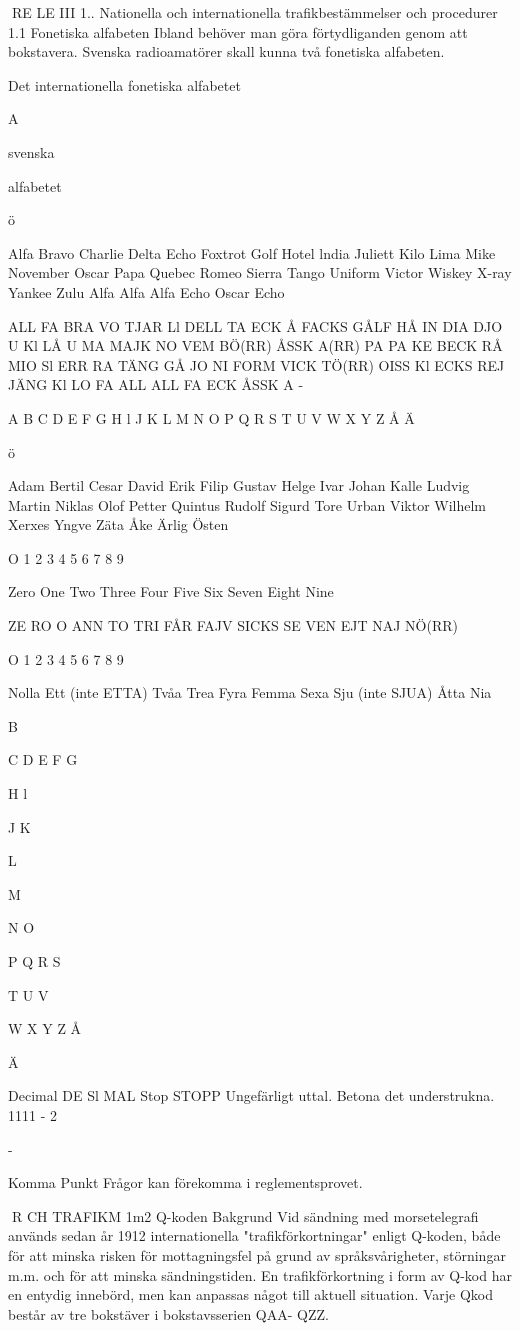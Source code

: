 RE LE
III 1.. Nationella och internationella trafikbestämmelser
och procedurer
1.1 Fonetiska alfabeten
Ibland behöver man göra förtydliganden genom att bokstavera.
Svenska radioamatörer skall kunna två fonetiska alfabeten.

Det internationella fonetiska alfabetet

A

svenska

alfabetet

ö

Alfa
Bravo
Charlie
Delta
Echo
Foxtrot
Golf
Hotel
lndia
Juliett
Kilo
Lima
Mike
November
Oscar
Papa
Quebec
Romeo
Sierra
Tango
Uniform
Victor
Wiskey
X-ray
Yankee
Zulu
Alfa Alfa
Alfa Echo
Oscar Echo

ALL FA
BRA VO
TJAR Ll
DELL TA
ECK Å
FACKS
GÅLF
HÅ
IN DIA
DJO U
Kl LÅ
U MA
MAJK
NO VEM BÖ(RR)
ÅSSK A(RR)
PA PA
KE BECK
RÅ MIO
Sl ERR RA
TÄNG GÅ
JO NI FORM
VICK TÖ(RR)
OISS Kl
ECKS REJ
JÄNG Kl
LO
FA ALL
ALL FA ECK
ÅSSK A -

A
B
C
D
E
F
G
H
l
J
K
L
M
N
O
P
Q
R
S
T
U
V
W
X
Y
Z
Å
Ä

ö

Adam
Bertil
Cesar
David
Erik
Filip
Gustav
Helge
Ivar
Johan
Kalle
Ludvig
Martin
Niklas
Olof
Petter
Quintus
Rudolf
Sigurd
Tore
Urban
Viktor
Wilhelm
Xerxes
Yngve
Zäta
Åke
Ärlig
Östen

O
1
2
3
4
5
6
7
8
9

Zero
One
Two
Three
Four
Five
Six
Seven
Eight
Nine

ZE RO
O ANN
TO
TRI
FÅR
FAJV
SICKS
SE VEN
EJT
NAJ NÖ(RR)

O
1
2
3
4
5
6
7
8
9

Nolla
Ett (inte ETTA)
Tvåa
Trea
Fyra
Femma
Sexa
Sju (inte SJUA)
Åtta
Nia

B

C
D
E
F
G

H
l

J
K

L

M

N
O

P
Q
R
S

T
U
V

W
X
Y
Z
Å

Ä

Decimal
DE Sl MAL
Stop
STOPP
Ungefärligt uttal. Betona det understrukna.
1111 - 2

-

Komma
Punkt
Frågor kan förekomma i reglementsprovet.

R CH TRAFIKM
1m2 Q-koden
Bakgrund
Vid sändning med morsetelegrafi används
sedan år 1912 internationella "trafikförkortningar" enligt Q-koden, både för att minska
risken för mottagningsfel på grund av språksvårigheter, störningar m.m. och för att minska sändningstiden. En trafikförkortning i form
av Q-kod har en entydig innebörd, men kan
anpassas något till aktuell situation. Varje Qkod består av tre bokstäver i bokstavsserien
QAA- QZZ.

